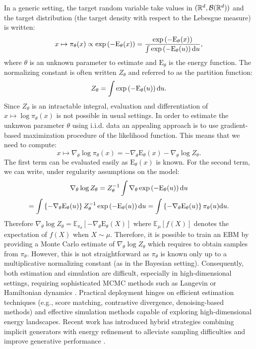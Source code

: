 \documentclass[english,graybox,envcountchap,envcountsame,sectrefs,shortlabels]{svmono}
\theoremstyle{style}
\begin{document}
In a generic setting, the target random variable take values in $(\mathbb{R}^d,\mathcal{B}(\mathbb{R}^d))$ and the target distribution (the target density with respect to the Lebesgue measure) is written:
$$
x\mapsto \pi_\theta(x) \propto \exp\left(-\mathrm{E}_\theta(x)\right) = \frac{\exp\left(-\mathrm{E}_\theta(x)\right)}{\int \exp\left(-\mathrm{E}_\theta(u)\right)\mathrm{d} u},
$$
where $\theta$ is an unknown parameter to estimate and $\mathrm{E}_\theta$ is the energy function. The normalizing constant is often written $Z_\theta$ and referred to as the partition function:
$$
Z_\theta = \int \exp\left(-\mathrm{E}_\theta(u)\right)\mathrm{d} u.
$$
Since $Z_\theta$ is an intractable integral, evaluation and
differentiation of $x\mapsto \log \pi_\theta(x)$ is not possible in usual settings. In order to estimate the unknwon parameter $\theta$ using i.i.d. data an appealing approach is to use gradient-based maximization procedure of the likelihood function. This means that we need to compute:
$$
x\mapsto \nabla_\theta \log\pi_\theta(x) = -\nabla_\theta\mathrm{E}_\theta(x) - \nabla_\theta \log Z_\theta.
$$
The first term can be evaluated easily as $\mathrm{E}_\theta(x)$ is known. For the second term, we can write, under regularity assumptions on the model:
\begin{multline*}
\nabla_\theta \log Z_\theta = Z_\theta^{-1} \int \nabla_\theta\exp\left(-\mathrm{E}_\theta(u)\right)\mathrm{d} u \\=  \int \left\{-\nabla_\theta \mathrm{E}_\theta(u)\right\}Z_\theta^{-1}\exp\left(-\mathrm{E}_\theta(u)\right)\mathrm{d} u = \int \left\{-\nabla_\theta \mathrm{E}_\theta(u)\right\}\pi_\theta(u)\mathrm{d} u .
\end{multline*}
Therefore $\nabla_\theta \log Z_\theta = \mathbb{E}_{\pi_\theta}[-\nabla_\theta \mathrm{E}_\theta(X)]$ where $\mathbb{E}_{\mu}[f(X)]$ denotes the expectation of $f(X)$ when $X\sim \mu$. Therefore, it is possible to train an EBM by providing a Monte Carlo estimate of $\nabla_\theta \log Z_\theta$ which requires to obtain samples from $\pi_\theta$. However, this is not straightforward as $\pi_\theta$ is known only up to a multiplicative normalizing constant (as in the Bayesian setting). Consequently, both estimation and simulation are difficult, especially in high-dimensional settings, requiring sophisticated MCMC methods such as Langevin or Hamiltonian dynamics \cite{du2019implicit}. Practical deployment hinges on efficient estimation techniques (e.g., score matching, contrastive divergence, denoising-based methods) and effective simulation methods capable of exploring high-dimensional energy landscapes. Recent work has introduced hybrid strategies combining implicit generators with energy refinement to alleviate sampling difficulties and improve generative performance \cite{arbel2020generalized}.
\end{document}
